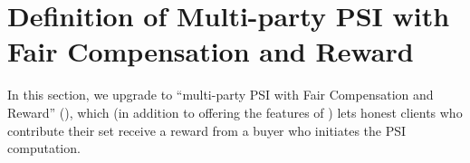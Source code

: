 



 \vspace{-2mm}

\section{Definition of Multi-party PSI with Fair Compensation and Reward}
 \vspace{-1mm}

In this section, we upgrade \p to ``multi-party PSI with Fair Compensation and Reward'' (\ep), which (in addition to offering the features of \p) lets honest clients who contribute their set receive a reward from a buyer who initiates the PSI computation. %





%  


